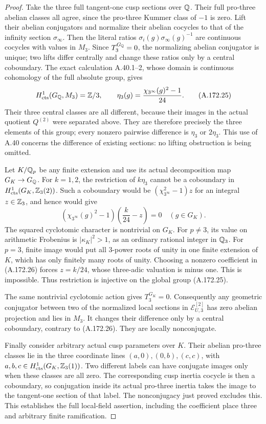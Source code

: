 \begin{proof}
Take the three full tangent-one cusp sections over \(\mathbb Q\).
Their full pro-three abelian classes all agree, since the
pro-three Kummer class of \(-1\) is zero.  Lift their abelian
conjugators and normalize their abelian cocycles to that of the
infinity section \(\sigma_\infty\).  Then the literal ratios
\(\sigma_i(g)\sigma_\infty(g)^{-1}\) are continuous cocycles
with values in \(M_3\).  Since \(T_3^{G_\mathbb Q}=0\), the
normalizing abelian conjugator is unique; two lifts differ
centrally and change these ratios only by a central coboundary.
The exact calculation
A.40.1--2, whose domain is continuous cohomology of the full
absolute group, gives
\[
 H^1_{\rm cts}(G_\mathbb Q,M_3)=\mathbb Z/3,\qquad
              \eta_3(g)=\frac{\chi_{3^\infty}(g)^2-1}{24}.
\tag{A.172.25}
\]
Their three central classes are all different, because their
images in the actual quotient \(Q^{(2)}\) were separated above.
They are therefore precisely the three elements of this group;
every nonzero pairwise difference is \(\eta_3\) or \(2\eta_3\).
This use of A.40 concerns the difference of existing sections:
no lifting obstruction is being omitted.

Let \(K/\mathbb Q_p\) be any finite extension and use its actual
decomposition map \(G_K\to G_\mathbb Q\).  For \(k=1,2\), the
restriction of \(k\eta_3\) cannot be a coboundary in
\(H^1_{\rm cts}(G_K,\mathbb Z_3(2))\).  Such a coboundary would be
\((\chi_{3^\infty}^2-1)z\) for an integral \(z\in\mathbb Z_3\),
and hence would give
\[
 (\chi_{3^\infty}(g)^2-1)
                 \left(\frac{k}{24}-z\right)=0
                        \quad(g\in G_K).
\tag{A.172.26}
\]
The squared cyclotomic character is nontrivial on \(G_K\).
For \(p\ne3\), its value on arithmetic Frobenius is
\(|\kappa_K|^2>1\), as an ordinary rational integer in \(\mathbb Q_3\).
For \(p=3\), finite image would put all \(3\)-power roots of
unity in one finite extension of \(K\), which has only finitely
many roots of unity.  Choosing a nonzero coefficient in
(A.172.26) forces \(z=k/24\), whose three-adic valuation is
minus one.  This is impossible.  Thus restriction is injective
on the global group (A.172.25).

The same nontrivial cyclotomic action gives \(T_3^{G_K}=0\).
Consequently any geometric conjugator between two of the
normalized local sections in \(\mathcal E_{U,3}^{[2]}\)
has zero abelian projection and lies in \(M_3\).  It changes
their difference only by a central coboundary, contrary to
(A.172.26).  They are locally nonconjugate.

Finally consider arbitrary actual cusp parameters over \(K\).
Their abelian pro-three classes lie in the three coordinate
lines \((a,0),(0,b),(c,c)\), with
\(a,b,c\in H^1_{\rm cts}(G_K,\mathbb Z_3(1))\).
Two different labels can have conjugate images only when these
classes are all zero.  The corresponding cusp inertia cocycle
is then a coboundary, so conjugation inside its actual pro-three
inertia takes the image to the tangent-one section of that label.
The nonconjugacy just proved excludes this.  This establishes
the full local-field assertion, including the coefficient place
three and arbitrary finite ramification.


\end{proof}

